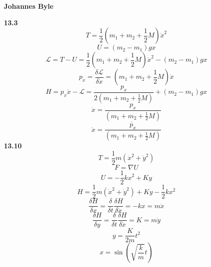 \documentclass[english]{article}
\begin{document}
\begin{multicols*}{2}
\textbf{Johannes Byle}\\
\newcommand{\Lagr}{\mathcal{L}}

\noindent
\textbf{13.3}\\
$$T=\frac{1}{2}(m_1+m_2+\frac{1}{2}M)\dot{x}^2$$
$$U=(m_2-m_1)gx$$
$$\Lagr=T-U=\frac{1}{2}(m_1+m_2+\frac{1}{2}M)\dot{x}^2-(m_2-m_1)gx$$
$$p_x=\frac{\delta\Lagr}{\delta \dot{x}}=(m_1+m_2+\frac{1}{2}M)\dot{x}$$
$$H=p_x\dot{x}-\Lagr=\frac{p_x}{2(m_1+m_2+\frac{1}{2}M)}+(m_2-m_1)gx$$
$$\dot{x}=\frac{p_x}{(m_1+m_2+\frac{1}{2}M)}$$
$$\ddot{x}=\frac{\dot{p_x}}{(m_1+m_2+\frac{1}{2}M)}$$
\noindent
\textbf{13.10}\\
$$T=\frac{1}{2}m(\dot{x}^2+\dot{y}^2)$$
$$F=\nabla U$$
$$U=-\frac{1}{2}kx^2+Ky$$
$$H=\frac{1}{2}m(\dot{x}^2+\dot{y}^2)+Ky-\frac{1}{2}kx^2$$
$$\frac{\delta H}{\delta x}=\frac{\delta}{\delta t}\frac{\delta H}{\delta \dot{x}}=-kx=m\ddot{x}$$
$$\frac{\delta H}{\delta y}=\frac{\delta}{\delta t}\frac{\delta H}{\delta \dot{x}}=K=m\ddot{y}$$
$$y=\frac{K}{2m}t^2$$
$$x=\sin(\sqrt{\frac{k}{m}}t)$$
\end{multicols*}
\end{document}
